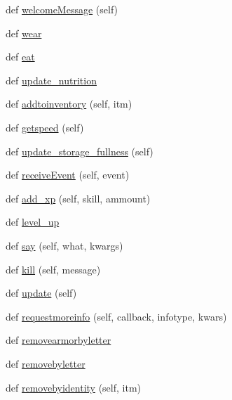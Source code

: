 \begin{DoxyCompactItemize}
\item 
def \hyperlink{classplayer__input_1_1_player_object_a1d0628c1c08c7140ab35437b1cdc9d6b}{welcome\+Message} (self)
\item 
def \hyperlink{classplayer__input_1_1_player_object_a6ab6a121ef8054a14532e93a4df61861}{wear}
\item 
def \hyperlink{classplayer__input_1_1_player_object_ad2ad0557d2b7c2225214f7f8f528325c}{eat}
\item 
def \hyperlink{classplayer__input_1_1_player_object_a4f44b910749a86fa11d4b33e79faadd8}{update\+\_\+nutrition}
\item 
def \hyperlink{classplayer__input_1_1_player_object_ad3e88c0f8d93bc855a79a358e1aaaa23}{addtoinventory} (self, itm)
\item 
def \hyperlink{classplayer__input_1_1_player_object_ac02046cfd454955a9e14f819aa0ad926}{getspeed} (self)
\item 
def \hyperlink{classplayer__input_1_1_player_object_a704ec767ee8a39c9af2fd8d23a9047d8}{update\+\_\+storage\+\_\+fullness} (self)
\item 
def \hyperlink{classplayer__input_1_1_player_object_aec6652d3566e917560257465fc85fb5f}{receive\+Event} (self, event)
\item 
def \hyperlink{classplayer__input_1_1_player_object_a7be8772bad156e6cab0ab2a4f965d0c0}{add\+\_\+xp} (self, skill, ammount)
\item 
def \hyperlink{classplayer__input_1_1_player_object_ae8722e8faf4f43a02a42e23ef7850a03}{level\+\_\+up}
\item 
def \hyperlink{classplayer__input_1_1_player_object_a4a933295bf981c9494dcd4e31fdc5c08}{say} (self, what, kwargs)
\item 
def \hyperlink{classplayer__input_1_1_player_object_aa78048d727b94561070090562e0b6989}{kill} (self, message)
\item 
def \hyperlink{classplayer__input_1_1_player_object_aa9e35918088b9264cd87786874a37d50}{update} (self)
\item 
def \hyperlink{classplayer__input_1_1_player_object_ad3afc9d7ed9ce3f7724b320a6c23a85c}{requestmoreinfo} (self, callback, infotype, kwars)
\item 
def \hyperlink{classplayer__input_1_1_player_object_aa4ffa7036a3b8539dd281e4bb10b1843}{removearmorbyletter}
\item 
def \hyperlink{classplayer__input_1_1_player_object_a94fac9dd2160e8a6d96b168ba712ad56}{removebyletter}
\item 
def \hyperlink{classplayer__input_1_1_player_object_a6bf34f95c0748bcd52009dd678e41a09}{removebyidentity} (self, itm)

\end{DoxyCompactItemize}
